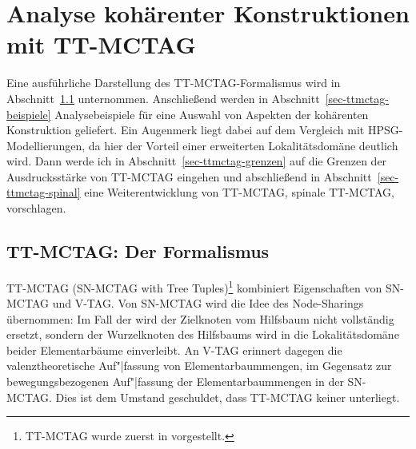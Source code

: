 \chapter{Analyse kohärenter Konstruktionen mit TT-MCTAG}\label{sec-ttmctag}

Eine ausführliche Darstellung des TT-MCTAG-Formalismus wird in Abschnitt~\ref{sec-ttmctag-formalismus} unternommen. Anschlie\ss end werden in Abschnitt~\ref{sec-ttmctag-beispiele} Analysebeispiele für eine Auswahl von Aspekten der kohärenten Konstruktion geliefert. Ein Augenmerk liegt dabei auf dem Vergleich mit HPSG-Modellierungen, da hier der Vorteil einer erweiterten Lokalitätsdomäne deutlich wird. Dann werde ich in Abschnitt~\ref{sec-ttmctag-grenzen} auf die Grenzen der Ausdrucksstärke von TT-MCTAG eingehen und abschlie\ss end in Abschnitt~\ref{sec-ttmctag-spinal} eine Weiterentwicklung von TT-MCTAG, spinale TT-MCTAG, vorschlagen. 

\section{TT-MCTAG: Der Formalismus}\label{sec-ttmctag-formalismus}

TT-MCTAG (SN-MCTAG with Tree Tuples)\footnote{TT-MCTAG wurde zuerst in \cite{Lichte:07} vorgestellt.} kombiniert Eigenschaften von SN-MCTAG und V-TAG. Von SN-MCTAG wird die Idee des Node-Sharings übernommen: Im Fall der  wird der Zielknoten vom Hilfsbaum nicht vollständig ersetzt, sondern der Wurzelknoten des Hilfsbaums wird in die Lokalitätsdomäne beider Elementarbäume einverleibt. An V-TAG erinnert dagegen die valenztheoretische Auf"|fassung von Elementarbaummengen, im Gegensatz zur bewegungsbezogenen Auf"|fassung der Elementarbaummengen in der SN-MCTAG. Dies ist dem Umstand geschuldet, dass TT-MCTAG keiner  unterliegt.

